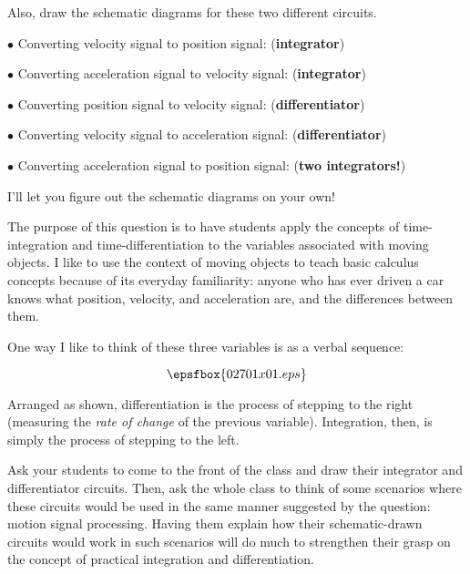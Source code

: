 \vskip 10pt

Also, draw the schematic diagrams for these two different circuits.







\medskip
\item{$\bullet$} Converting velocity signal to position signal: ({\bf integrator})
\item{$\bullet$} Converting acceleration signal to velocity signal: ({\bf integrator})
\item{$\bullet$} Converting position signal to velocity signal: ({\bf differentiator})
\item{$\bullet$} Converting velocity signal to acceleration signal: ({\bf differentiator})
\item{$\bullet$} Converting acceleration signal to position signal: ({\bf two integrators!})
\medskip

\vskip 10pt

I'll let you figure out the schematic diagrams on your own!







The purpose of this question is to have students apply the concepts of time-integration and time-differentiation to the variables associated with moving objects.  I like to use the context of moving objects to teach basic calculus concepts because of its everyday familiarity: anyone who has ever driven a car knows what position, velocity, and acceleration are, and the differences between them.

One way I like to think of these three variables is as a verbal sequence:

$$\epsfbox{02701x01.eps}$$

Arranged as shown, differentiation is the process of stepping to the right (measuring the {\it rate of change} of the previous variable).  Integration, then, is simply the process of stepping to the left.

\vskip 10pt

Ask your students to come to the front of the class and draw their integrator and differentiator circuits.  Then, ask the whole class to think of some scenarios where these circuits would be used in the same manner suggested by the question: motion signal processing.  Having them explain how their schematic-drawn circuits would work in such scenarios will do much to strengthen their grasp on the concept of practical integration and differentiation.




